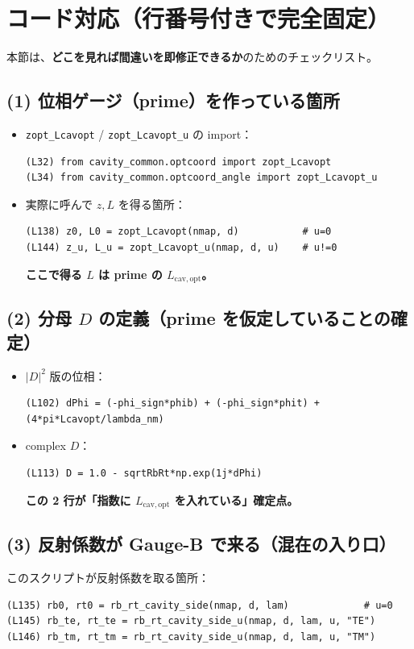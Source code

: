 \documentclass[a4paper,11pt]{article}
\begin{document}
\section{コード対応（行番号付きで完全固定）}

本節は、\textbf{どこを見れば間違いを即修正できるか}のためのチェックリスト。

\subsection{(1) 位相ゲージ（prime）を作っている箇所}
\begin{itemize}
\item \texttt{zopt\_Lcavopt} / \texttt{zopt\_Lcavopt\_u} の import：
\begin{lstlisting}
(L32) from cavity_common.optcoord import zopt_Lcavopt
(L34) from cavity_common.optcoord_angle import zopt_Lcavopt_u
\end{lstlisting}

\item 実際に呼んで \(z,L\) を得る箇所：
\begin{lstlisting}
(L138) z0, L0 = zopt_Lcavopt(nmap, d)           # u=0
(L144) z_u, L_u = zopt_Lcavopt_u(nmap, d, u)    # u!=0
\end{lstlisting}

\textbf{ここで得る \(L\) は prime の \(L_{\mathrm{cav,opt}}\)。}
\end{itemize}

\subsection{(2) 分母 \(D\) の定義（prime を仮定していることの確定）}
\begin{itemize}
\item \(|D|^2\) 版の位相：
\begin{lstlisting}
(L102) dPhi = (-phi_sign*phib) + (-phi_sign*phit) + (4*pi*Lcavopt/lambda_nm)
\end{lstlisting}
\item complex \(D\)：
\begin{lstlisting}
(L113) D = 1.0 - sqrtRbRt*np.exp(1j*dPhi)
\end{lstlisting}

\textbf{この 2 行が「指数に \(L_{\mathrm{cav,opt}}\) を入れている」確定点。}
\end{itemize}

\subsection{(3) 反射係数が Gauge-B で来る（混在の入り口）}
このスクリプトが反射係数を取る箇所：
\begin{lstlisting}
(L135) rb0, rt0 = rb_rt_cavity_side(nmap, d, lam)             # u=0
(L145) rb_te, rt_te = rb_rt_cavity_side_u(nmap, d, lam, u, "TE")
(L146) rb_tm, rt_tm = rb_rt_cavity_side_u(nmap, d, lam, u, "TM")
\end{lstlisting}
\end{document}
